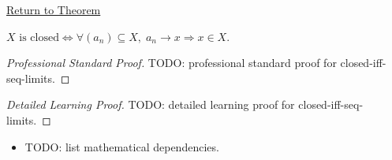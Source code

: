 \newpage
{}
\label{prf:closed-iff-seq-limits}

\begin{remark*}[Return]
\hyperref[cor:closed-iff-seq-limits]{Return to Theorem}
\end{remark*}

\begin{corollary*}
$X\text{ is closed} \iff \forall (a_n)\subseteq X,\;
a_n \to x \Rightarrow x \in X$.

\smallskip\noindent
\end{corollary*}

\begin{proof}[Professional Standard Proof]
\LRAProofBodyStart
TODO: professional standard proof for closed-iff-seq-limits.
\end{proof}

\begin{proof}[Detailed Learning Proof]
\LRAProofBodyStart
TODO: detailed learning proof for closed-iff-seq-limits.
\end{proof}

\begin{remark*}
\end{remark*}

\begin{dependencies}
\begin{itemize}
  \item TODO: list mathematical dependencies.
\end{itemize}
\end{dependencies}

\clearpage

